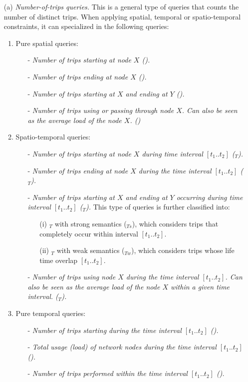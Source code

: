 	\begin{itemize}
		\item[(a)] {\em Number-of-trips queries.} This is a general type of queries that counts the number of distinct trips. When applying spatial, temporal or spatio-temporal constraints, it can specialized in the following queries:
		
		\begin{enumerate}
			\item Pure spatial queries:
			\begin{itemize}
				\item[-] {\em Number of trips starting at node $X$ (\startX).}
				\item[-] {\em Number of trips ending at node $X$ (\endX).} 
				\item[-] {\em Number of trips starting at $X$ and ending at $Y$ (\XtoY).}
				\item[-] {\em Number of trips using or passing through node $X$. Can also be seen as the average load of the node $X$. (\loadX)}
			\end{itemize}
			
			\item Spatio-temporal queries:
			\begin{itemize}
				\item[-] {\em Number of trips starting at node $X$ during time interval $[t_1..t_2]$ (\startX$_T$).}
				\item[-] {\em Number of trips ending at node $X$ during the time interval $[t_1..t_2]$ (\endX$_T$). }
				\item[-] {\em Number of trips starting at $X$ and ending at $Y$ occurring during  time interval $[t_1..t_2]$ (\XtoY$_T$).} This type of queries is further classified into: 
				\begin{itemize}
				    \item[(i)] \XtoY$_T$ with strong semantics (\XtoY$_{Ts}$), which considers trips that completely occur within interval $[t_1..t_2]$.
				    \item[(ii)] \XtoY$_T$ with weak semantics (\XtoY$_{Tw}$), which considers trips whose life time overlap $[t_1..t_2]$.
				\end{itemize}
				\item[-] {\em Number of trips using node $X$ during the time interval $[t_1..t_2]$. Can also be seen as the average load of the node $X$ within a given time interval. (\loadX$_T$).}
			\end{itemize}
			
			\item Pure temporal queries:
			\begin{itemize}
				\item[-] {\em Number of trips starting during the time interval $[t_1..t_2]$ (\startT). } 
				\item[-] {\em Total usage (load) of network nodes during the time interval $[t_1..t_2]$ (\loadT).}
				\item[-] {\em Number of trips performed within the time interval $[t_1..t_2]$ (\tripT).} 
			\end{itemize}
		\end{enumerate}
		

\end{itemize}
